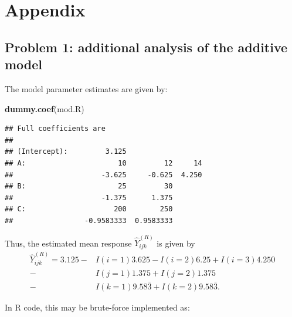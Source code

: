 \documentclass[
  11pt,
]{article}
\newenvironment{Shaded}{\begin{snugshade}}{\end{snugshade}}
\newcommand{\FunctionTok}[1]{\textcolor[rgb]{0.13,0.29,0.53}{\textbf{#1}}}
\newcommand{\NormalTok}[1]{#1}
\begin{document}
\hypertarget{appendix}{%
\section{Appendix}\label{appendix}}

\hypertarget{problem-1-additional-analysis-of-the-additive-model}{%
\subsection{Problem 1: additional analysis of the additive
model}\label{problem-1-additional-analysis-of-the-additive-model}}

The model parameter estimates are given by:

\begin{Shaded}
\begin{Highlighting}[]
\FunctionTok{dummy.coef}\NormalTok{(mod.R)}
\end{Highlighting}
\end{Shaded}

\begin{verbatim}
## Full coefficients are 
##                                             
## (Intercept):         3.125                  
## A:                      10         12     14
##                     -3.625     -0.625  4.250
## B:                      25         30       
##                     -1.375      1.375       
## C:                     200        250       
##                 -0.9583333  0.9583333
\end{verbatim}

Thus, the estimated mean response \(\hat{Y}_{i j k}^{(R)}\) is given by
\begin{align*}
  \hat{Y}_{i j k}^{(R)} = 3.125
    - &I(i=1) 3.625 - I(i=2) 6.25 + I(i=3) 4.250\\
    - &I(j=1) 1.375 + I(j=2) 1.375\\
    - &I(k=1) 9.58\bar{3} + I(k=2) 9.58\bar{3}.
\end{align*}

In R code, this may be brute-force implemented as:
\end{document}

